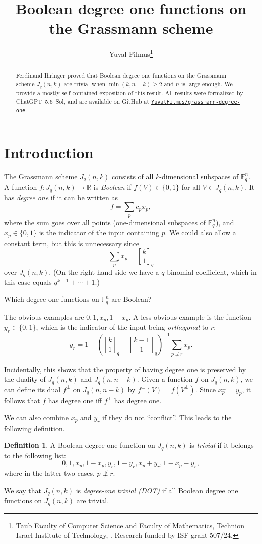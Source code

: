 \documentclass{article}
\title{Boolean degree one functions on the Grassmann scheme}
\author{Yuval Filmus\footnote{Taub Faculty of Computer Science and Faculty of Mathematics, Technion Israel Institute of Technology, \blueemail{yuvalfi@cs.technion.ac.il}. Research funded by ISF grant 507/24.}}
\theoremstyle{definition}
\newtheorem{definition}[theorem]{Definition}
\providecommand{\sqbinom}[2]{\genfrac{[}{]}{0pt}{}{#1}{#2}}
\providecommand{\FF}{\mathbb{F}}
\providecommand{\RR}{\mathbb{R}}
\begin{document}
\maketitle
\begin{abstract}
Ferdinand Ihringer proved that Boolean degree one functions on the Grassmann scheme $J_q(n,k)$ are trivial when $\min(k,n-k) \ge 2$ and $n$ is large enough. We provide a mostly self-contained exposition of this result. All results were formalized by ChatGPT~5.6~Sol, and are available on GitHub at \href{https://github.com/YuvalFilmus/grassmann-degree-one}{\texttt{YuvalFilmus/grassmann-degree-one}}.
\end{abstract}

\section{Introduction}
\label{sec:introduction}

The Grassmann scheme $J_q(n,k)$ consists of all $k$-dimensional subspaces of $\FF_q^n$. A function $f\colon J_q(n,k) \to \RR$ is \emph{Boolean} if $f(V) \in \{0,1\}$ for all $V \in J_q(n,k)$. It has \emph{degree one} if it can be written as
\[
 f = \sum_p c_p x_p,
\]
where the sum goes over all points (one-dimensional subspaces of $\FF_q^n$), and $x_p \in \{0,1\}$ is the indicator of the input containing $p$. We could also allow a constant term, but this is unnecessary since
\[
 \sum_p x_p = \sqbinom{k}{1}_q
\]
over $J_q(n,k)$. (On the right-hand side we have a $q$-binomial coefficient, which in this case equals $q^{k-1} + \cdots + 1$.)

\begin{tcolorbox}[colback=blue!5!white,colframe=blue!75!black]
  Which degree one functions on $\FF_q^n$ are Boolean?
\end{tcolorbox}

The obvious examples are $0, 1, x_p, 1-x_p$. A less obvious example is the function $y_r \in \{0,1\}$, which is the indicator of the input being \emph{orthogonal} to $r$:
\[
 y_r = 1 - \left(\sqbinom{k}{1}_q - \sqbinom{k-1}{1}_q\right)^{-1} \sum_{p \not\perp r} x_p.
\]

Incidentally, this shows that the property of having degree one is preserved by the duality of $J_q(n,k)$ and $J_q(n,n-k)$. Given a function $f$ on $J_q(n,k)$, we can define its dual $f^\perp$ on $J_q(n,n-k)$ by $f^\perp(V) = f(V^\perp)$. Since $x_p^\perp = y_p$, it follows that $f$ has degree one iff $f^\perp$ has degree one.

We can also combine $x_p$ and $y_r$ if they do not ``conflict''. This leads to the following definition.
\begin{definition} \label{def:trivial}
A Boolean degree one function on $J_q(n,k)$ is \emph{trivial} if it belongs to the following list:
\[
 0, 1, x_p, 1-x_p, y_r, 1-y_r, x_p+y_r, 1-x_p-y_r,
\]
where in the latter two cases, $p \not\perp r$.

We say that $J_q(n,k)$ is \emph{degree-one trivial (DOT)} if all Boolean degree one functions on $J_q(n,k)$ are trivial.
\end{definition}
\end{document}
